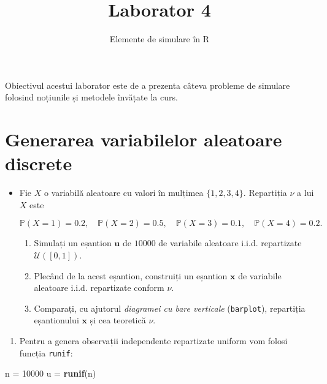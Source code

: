 \documentclass[]{article}
\title{Laborator 4}
\subtitle{Elemente de simulare în R}
\author{}
\date{}
\newenvironment{Shaded}{\begin{snugshade}}{\end{snugshade}}
\newcommand{\KeywordTok}[1]{\textcolor[rgb]{0.13,0.29,0.53}{\textbf{#1}}}
\newcommand{\DecValTok}[1]{\textcolor[rgb]{0.00,0.00,0.81}{#1}}
\newcommand{\StringTok}[1]{\textcolor[rgb]{0.31,0.60,0.02}{#1}}
\newcommand{\NormalTok}[1]{#1}
\providecommand{\tightlist}{%
  \setlength{\itemsep}{0pt}\setlength{\parskip}{0pt}}
\newenvironment{frshaded*}{%
  \def\FrameCommand{\fboxrule=\FrameRule\fboxsep=\FrameSep \fcolorbox{framecolor}{shadecolor1}}%
  \MakeFramed {\advance\hsize-\width \FrameRestore}}%
{\endMakeFramed}
\newenvironment{rmdblock}[1]
  {\begin{frshaded*}
  \begin{itemize}
  \renewcommand{\labelitemi}{
    \raisebox{-.7\height}[0pt][0pt]{
      {\setkeys{Gin}{width=2em,keepaspectratio}\texttt{[image: images/icons/\#1]}}
    }
  }
  \item
  }
  {
  \end{itemize}
  \end{frshaded*}
  }
\newenvironment{rmdexercise}
  {\begin{rmdblock}{exercise}}
  {\end{rmdblock}}
\begin{document}
\maketitle

\thispagestyle{fancy}

Obiectivul acestui laborator este de a prezenta câteva probleme de
simulare folosind noțiunile și metodele învățate la curs.

\section{Generarea variabilelor aleatoare
discrete}\label{generarea-variabilelor-aleatoare-discrete}

\begin{rmdexercise}
Fie \(X\) o variabilă aleatoare cu valori în mulțimea \(\{1,2,3,4\}\).
Repartiția \(\nu\) a lui \(X\) este

\[
  \mathbb{P}(X = 1) = 0.2, \quad \mathbb{P}(X = 2) = 0.5, \quad \mathbb{P}(X = 3) = 0.1,  \quad \mathbb{P}(X = 4) = 0.2. 
\]

\begin{enumerate}
\def\labelenumi{\arabic{enumi}.}
\item
  Simulați un eșantion \(\boldsymbol u\) de \(10000\) de variabile
  aleatoare i.i.d. repartizate \(\mathcal{U}([0,1])\).
\item
  Plecând de la acest eșantion, construiți un eșantion \(\boldsymbol x\)
  de variabile aleatoare i.i.d. repartizate conform \(\nu\).
\item
  Comparați, cu ajutorul \emph{diagramei cu bare verticale}
  (\texttt{barplot}), repartiția eșantionului \(\boldsymbol x\) și cea
  teoretică \(\nu\).
\end{enumerate}
\end{rmdexercise}

\begin{enumerate}
\def\labelenumi{\arabic{enumi}.}
\tightlist
\item
  Pentru a genera observații independente repartizate uniform vom folosi
  funcția \texttt{runif}:
\end{enumerate}

\begin{Shaded}
\begin{Highlighting}[]
\NormalTok{n =}\StringTok{  }\DecValTok{10000}
\NormalTok{u =}\StringTok{ }\KeywordTok{runif}\NormalTok{(n)}
\end{Highlighting}
\end{Shaded}
\end{document}

